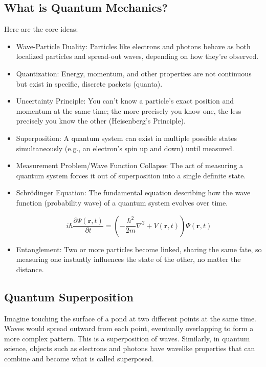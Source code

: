 \documentclass[17pt,a4paper]{extarticle}
\begin{document}
\subsection{What is Quantum Mechanics?}
Here are the core ideas:
\begin{itemize}
  \item Wave-Particle Duality: Particles like electrons and photons behave as both localized particles and spread-out waves, depending on how they're observed.
  \item Quantization: Energy, momentum, and other properties are not continuous but exist in specific, discrete packets (quanta).
  \item Uncertainty Principle: You can't know a particle's exact position and momentum at the same time; the more precisely you know one, the less precisely you know the other (Heisenberg's Principle).
  \item Superposition: A quantum system can exist in multiple possible states simultaneously (e.g., an electron's spin up and down) until measured.
  \item Measurement Problem/Wave Function Collapse: The act of measuring a quantum system forces it out of superposition into a single definite state.
  \item Schrödinger Equation: The fundamental equation describing how the wave function (probability wave) of a quantum system evolves over time.

\begin{equation*}
i\hbar \frac{\partial \Psi(\mathbf{r},t)}{\partial t}
=
\left(
-\frac{\hbar^2}{2m}\nabla^2 + V(\mathbf{r},t)
\right)
\Psi(\mathbf{r},t)
\end{equation*}

  \item Entanglement: Two or more particles become linked, sharing the same fate, so measuring one instantly influences the state of the other, no matter the distance.

\end{itemize}

\subsection{Quantum Superposition}
Imagine touching the surface of a pond at two different points at the same time. Waves would spread outward from each point, eventually overlapping to form a more complex pattern. This is a superposition of waves. Similarly, in quantum science, objects such as electrons and photons have wavelike properties that can combine and become what is called superposed.
\end{document}
